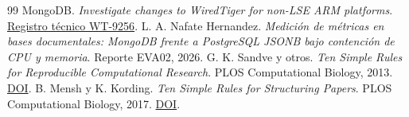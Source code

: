\documentclass[10pt,a4paper]{article}
\begin{document}
\begin{thebibliography}{99}
 MongoDB. \textit{Investigate changes to WiredTiger for non-LSE ARM platforms}. \href{https://jira.mongodb.org/browse/WT-9256}{Registro técnico WT-9256}.
 L. A. Nafate Hernandez. \textit{Medición de métricas en bases documentales: MongoDB frente a PostgreSQL JSONB bajo contención de CPU y memoria}. Reporte EVA02, 2026.
 G. K. Sandve y otros. \textit{Ten Simple Rules for Reproducible Computational Research}. PLOS Computational Biology, 2013. \href{https://doi.org/10.1371/journal.pcbi.1003285}{DOI}.
 B. Mensh y K. Kording. \textit{Ten Simple Rules for Structuring Papers}. PLOS Computational Biology, 2017. \href{https://doi.org/10.1371/journal.pcbi.1005619}{DOI}.
\end{thebibliography}
\end{document}

